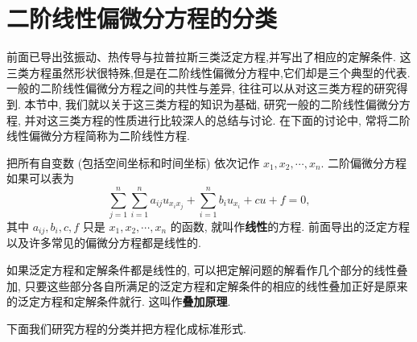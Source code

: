 \section{二阶线性偏微分方程的分类}
前面已导出弦振动、热传导与拉普拉斯三类泛定方程,并写出了相应的定解条件.
这三类方程虽然形状很特殊,但是在二阶线性偏微分方程中,它们却是三个典型的代表.
一般的二阶线性偏微分方程之间的共性与差异, 往往可以从对这三类方程的研究得到.
本节中, 我们就以关于这三类方程的知识为基础, 
研究一般的二阶线性偏微分方程, 并对这三类方程的性质进行比较深人的总结与讨论. 
在下面的讨论中, 常将二阶线性偏微分方程简称为二阶线性方程.

把所有自变数 (包括空间坐标和时间坐标) 依次记作 $x_1, x_2, \cdots, x_n$. 二阶偏微分方程如果可以表为
\begin{equation}
    \sum_{j=1}^n \sum_{i=1}^n a_{i j} u_{x_i x_j}+\sum_{i=1}^n b_i u_{x_i}+c u+f=0,
    \label{eq:general_2nd_order_diff_equation}
\end{equation} 
其中 $a_{i j}, b_i, c, f$ 只是 $x_1, x_2, \cdots, x_n$ 的函数, 就叫作\textbf{线性}的方程. 
前面导出的泛定方程以及许多常见的偏微分方程都是线性的.


如果泛定方程和定解条件都是线性的, 可以把定解问题的解看作几个部分的线性叠加,
 只要这些部分各自所满足的泛定方程和定解条件的相应的线性叠加正好是原来的泛定方程和定解条件就行. 
 这叫作\textbf{叠加原理}. 

 下面我们研究方程的分类并把方程化成标准形式.
